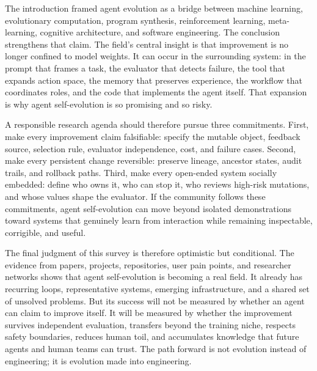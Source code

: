 The introduction framed agent evolution as a bridge between machine learning, evolutionary computation, program synthesis, reinforcement learning, meta-learning, cognitive architecture, and software engineering. The conclusion strengthens that claim. The field's central insight is that improvement is no longer confined to model weights. It can occur in the surrounding system: in the prompt that frames a task, the evaluator that detects failure, the tool that expands action space, the memory that preserves experience, the workflow that coordinates roles, and the code that implements the agent itself. That expansion is why agent self-evolution is so promising and so risky.

A responsible research agenda should therefore pursue three commitments. First, make every improvement claim falsifiable: specify the mutable object, feedback source, selection rule, evaluator independence, cost, and failure cases. Second, make every persistent change reversible: preserve lineage, ancestor states, audit trails, and rollback paths. Third, make every open-ended system socially embedded: define who owns it, who can stop it, who reviews high-risk mutations, and whose values shape the evaluator. If the community follows these commitments, agent self-evolution can move beyond isolated demonstrations toward systems that genuinely learn from interaction while remaining inspectable, corrigible, and useful.

The final judgment of this survey is therefore optimistic but conditional. The evidence from papers, projects, repositories, user pain points, and researcher networks shows that agent self-evolution is becoming a real field. It already has recurring loops, representative systems, emerging infrastructure, and a shared set of unsolved problems. But its success will not be measured by whether an agent can claim to improve itself. It will be measured by whether the improvement survives independent evaluation, transfers beyond the training niche, respects safety boundaries, reduces human toil, and accumulates knowledge that future agents and human teams can trust. The path forward is not evolution instead of engineering; it is evolution made into engineering.

